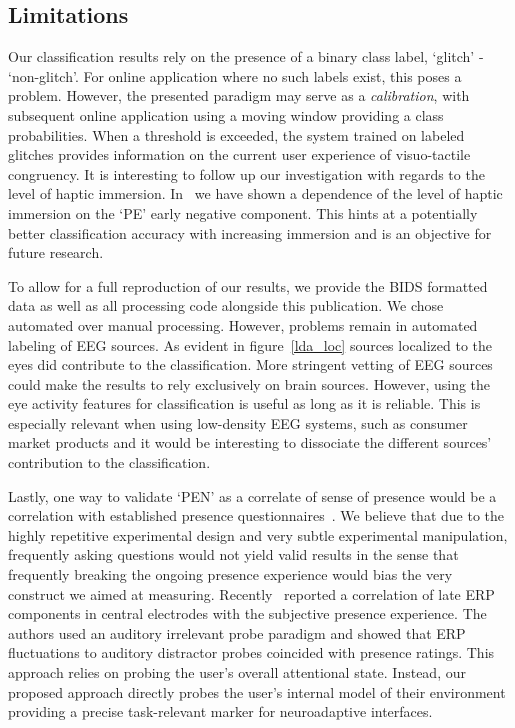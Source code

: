 \subsection{Limitations}

Our classification results rely on the presence of a binary class label, `glitch' - `non-glitch'. For online application where no such labels exist, this poses a problem. However, the presented paradigm may serve as a \textit{calibration}, with subsequent online application using a moving window providing a class probabilities. When a threshold is exceeded, the system trained on labeled glitches provides information on the current user experience of visuo-tactile congruency. It is interesting to follow up our investigation with regards to the level of haptic immersion. In~\citet{Gehrke2019-og} we have shown a dependence of the level of haptic immersion on the `PE' early negative component. This hints at a potentially better classification accuracy with increasing immersion and is an objective for future research.

To allow for a full reproduction of our results, we provide the BIDS formatted data as well as all processing code alongside this publication. We chose automated over manual processing. However, problems remain in automated labeling of EEG sources. As evident in figure~\ref{lda_loc} sources localized to the eyes did contribute to the classification. More stringent vetting of EEG sources could make the results to rely exclusively on brain sources. However, using the eye activity features for classification is useful as long as it is reliable. This is especially relevant when using low-density EEG systems, such as consumer market products and it would be interesting to dissociate the different sources' contribution to the classification.

Lastly, one way to validate `PEN' as a correlate of sense of presence would be a correlation with established presence questionnaires~\cites{Witmer1998-ew,Schubert2003-sq}. We believe that due to the highly repetitive experimental design and very subtle experimental manipulation, frequently asking questions would not yield valid results in the sense that frequently breaking the ongoing presence experience would bias the very construct we aimed at measuring. Recently~\cite{Grassini2021-tc} reported a correlation of late ERP components in central electrodes with the subjective presence experience. The authors used an auditory irrelevant probe paradigm and showed that ERP fluctuations to auditory distractor probes coincided with presence ratings. This approach relies on probing the user's overall attentional state. Instead, our proposed approach directly probes the user's internal model of their environment providing a precise task-relevant marker for neuroadaptive interfaces\cite{Krol2020-lj}.


